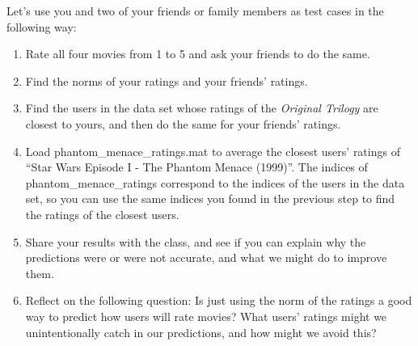 \documentclass{ximera}
\begin{document}
    Let's use you and two of your friends or family members as test cases in the following way: 
    
    \begin{enumerate}
    
      \item  Rate all four movies from 1 to 5 and ask your friends to do the same. 
      \item Find the norms of your ratings and your friends' ratings.
      \item Find the users in the data set whose ratings of the \emph{Original Trilogy} are closest to yours, and then do the same for your friends' ratings.
      \item Load phantom\_menace\_ratings.mat to average the closest users' ratings of ``Star Wars Episode I - The Phantom Menace (1999)''. The indices of phantom\_menace\_ratings correspond to the indices of the users in the data set, so you can use the same indices you found in the previous step to find the ratings of the closest users.
      \item Share your results with the class, and see if you can explain why the predictions were or were not accurate, and what we might do to improve them.
      \item Reflect on the following question: Is just using the norm of the ratings a good way to predict how users will rate movies? What users' ratings might we unintentionally catch in our predictions, and how might we avoid this?
    \end{enumerate}
\end{document}

